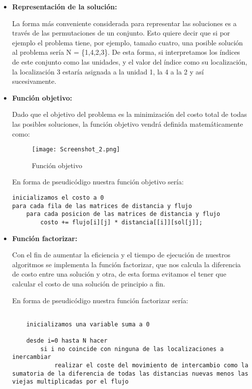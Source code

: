 \begin{itemize}
	\item \textbf{Representación de la solución: }
	
	La forma más conveniente considerada para representar las soluciones es a través de las permutaciones de un conjunto. Esto quiere decir que si por ejemplo el problema tiene, por ejemplo, tamaño cuatro, una posible solución al problema sería N = \{1,4,2,3\}. De esta forma, si interpretamos los índices de este conjunto como las unidades, y el valor del índice como su localización, la localización 3 estaría asignada a la unidad 1, la 4 a la 2 y así sucesivamente.
	
	\item \textbf{Función objetivo:}
	
	Dado que el objetivo del problema es la minimización del costo total de todas las posibles soluciones, la función objetivo vendrá definida matemáticamente como:
	
	\begin{figure}[H]
		\centering
		\texttt{[image: Screenshot\_2.png]}
		\caption{Función objetivo}
		\label{}
	\end{figure}
	\newpage
	En forma de pseudicódigo nuestra función objetivo sería:
	
	\begin{lstlisting}[language=SH]
inicializamos el costo a 0
para cada fila de las matrices de distancia y flujo
	para cada posicion de las matrices de distancia y flujo
		costo += flujo[i][j] * distancia[[i]][sol[j]];

	\end{lstlisting}
	
	\item \textbf{Función factorizar:}
	
	Con el fin de aumentar la eficiencia y el tiempo de ejecución de nuestros algoritmos se implementa la función factorizar, que nos calcula la diferencia de costo entre una solución y otra, de esta forma evitamos el tener que calcular el costo de una solución de principio a fin.
	
	En forma de pseudicódigo nuestra función factorizar sería:
	
	\begin{lstlisting}[language=SH]
	
    inicializamos una variable suma a 0
    
    desde i=0 hasta N hacer
	    si i no coincide con ninguna de las localizaciones a inercambiar
		    realizar el coste del movimiento de intercambio como la sumatoria de la diferencia de todas las distancias nuevas menos las viejas multiplicadas por el flujo
	

\end{lstlisting}
\end{itemize}
